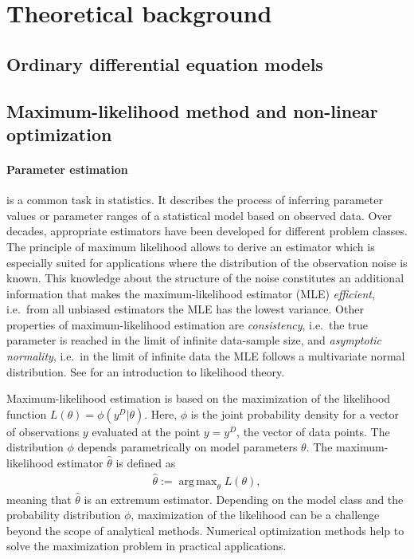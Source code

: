 \documentclass[article]{jss}
\DeclareMathOperator*{\argmax}{arg\,max}
\begin{document}
\section{Theoretical background}
\label{sec:theory}

\subsection{Ordinary differential equation models}

\subsection{Maximum-likelihood method and non-linear optimization}

\paragraph{Parameter estimation} is a common task in statistics. It describes the process of inferring parameter values or parameter ranges of a statistical model based on observed data. Over decades, appropriate estimators have been developed for different problem classes. The principle of maximum likelihood allows to derive an estimator which is especially suited for applications where the distribution of the observation noise is known. This knowledge about the structure of the noise constitutes an additional information that makes the maximum-likelihood estimator (MLE) \textit{efficient}, i.e.~from all unbiased estimators the MLE has the lowest variance. Other properties of maximum-likelihood estimation are \textit{consistency}, i.e.~the true parameter is reached in the limit of infinite data-sample size, and \textit{asymptotic normality}, i.e.~in the limit of infinite data the MLE follows a multivariate normal distribution. See \citep{azzalini1996statistical} for an introduction to likelihood theory.

Maximum-likelihood estimation is based on the maximization of the likelihood function $L(\theta) = \phi(y^D|\theta)$. Here, $\phi$ is the joint probability density for a vector of observations $y$ evaluated at the point $y = y^D$, the vector of data points. The distribution $\phi$ depends parametrically on model parameters $\theta$. The maximum-likelihood estimator $\hat\theta$ is defined as
\begin{align*}
	\hat \theta := \argmax_{\theta} L(\theta),
\end{align*}
meaning that $\hat\theta$ is an extremum estimator. Depending on the model class and the probability distribution $\phi$, maximization of the likelihood can be a challenge beyond the scope of analytical methods. Numerical optimization methods help to solve the maximization problem in practical applications.
\end{document}
